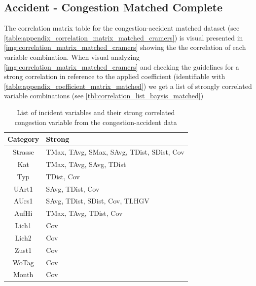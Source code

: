 \subsection{Accident - Congestion Matched Complete}
\label{analysis_processing_correlation}
The correlation matrix table for the congestion-accident matched dataset (see \autoref{table:appendix_correlation_matrix_matched_cramers}) is visual presented in \autoref{img:correlation_matrix_matched_cramers} showing the the correlation of each variable combination. When visual analyzing \autoref{img:correlation_matrix_matched_cramers} and checking the guidelines for a strong correlation in reference to the applied coefficient (identifiable with \autoref{table:appendix_coefficient_matrix_matched}) we get a list of strongly correlated variable combinations (see \autoref{tbl:correlation_list_baysis_matched})

\begin{table}[ht]
	\centering
	\begin{tabular}{c|l}  
		\toprule
		Category & Strong \\
		\midrule
		Strasse & TMax, TAvg, SMax, SAvg, TDist, SDist, Cov \\ 
 		Kat & TMax, TAvg, SAvg, TDist \\ 
 		Typ & TDist, Cov \\
 		UArt1 & SAvg, TDist, Cov \\
 		AUrs1 & SAvg, TDist, SDist, Cov, TLHGV \\
 		AufHi & TMax, TAvg, TDist, Cov \\
 		Lich1 & Cov \\
 		Lich2 & Cov \\
 		Zust1 & Cov \\
 		WoTag & Cov \\
		Month & Cov \\
		\bottomrule
	\end{tabular}
	\caption{List of incident variables and their strong correlated congestion variable from the congestion-accident data}
	\label{tbl:correlation_list_baysis_matched}
\end{table}

